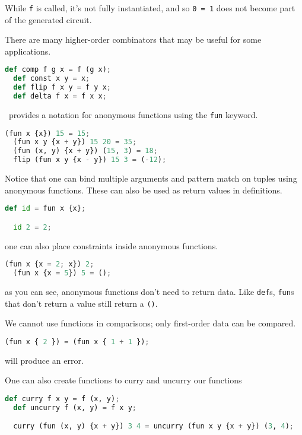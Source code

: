 While \lstinline{f} is called, it's not fully instantiated, and so \lstinline{0 = 1} does not become part of the generated circuit.

There are many higher-order combinators that may be useful for some applications.

\begin{lstlisting}[language=Python]
  def comp f g x = f (g x);
  def const x y = x;
  def flip f x y = f y x;
  def delta f x = f x x;
\end{lstlisting}

\vampir\ provides a notation for anonymous functions using the \lstinline{fun} keyword.

\begin{lstlisting}[language=Python]
  (fun x {x}) 15 = 15;
  (fun x y {x + y}) 15 20 = 35;
  (fun (x, y) {x + y}) (15, 3) = 18;
  flip (fun x y {x - y}) 15 3 = (-12);
\end{lstlisting}

Notice that one can bind multiple arguments and pattern match on tuples using anonymous functions. These can also be used as return values in definitions.

\begin{lstlisting}[language=Python]
  def id = fun x {x};

  id 2 = 2;
\end{lstlisting}

one can also place constraints inside anonymous functions.

\begin{lstlisting}[language=Python]
  (fun x {x = 2; x}) 2;
  (fun x {x = 5}) 5 = ();
\end{lstlisting}

as you can see, anonymous functions don't need to return data. Like \lstinline{def}s, \lstinline{fun}s that don't return a value still return a \lstinline{()}.

We cannot use functions in comparisons; only first-order data can be compared. 

\begin{lstlisting}[language=Python]
  (fun x { 2 }) = (fun x { 1 + 1 });
\end{lstlisting}

will produce an error.

One can also create functions to curry and uncurry our functions

\begin{lstlisting}[language=Python]
  def curry f x y = f (x, y);
  def uncurry f (x, y) = f x y;

  curry (fun (x, y) {x + y}) 3 4 = uncurry (fun x y {x + y}) (3, 4);
\end{lstlisting}

